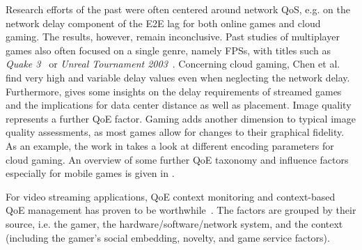 Research efforts of the past were often centered around network \acrshort{QoS}, e.g. on the network delay component of the \gls{E2E} lag for both online games and cloud gaming. The results, however, remain inconclusive. Past studies of multiplayer games also often focused on a single genre, namely \glspl{FPS}, with titles such as \textit{Quake 3}~\cite{1266180} or \textit{Unreal Tournament 2003}~\cite{Beigbeder:2004:ELL:1016540.1016556}. Concerning cloud gaming, Chen et al.~\cite{6670099} find very high and variable delay values even when neglecting the network delay. Furthermore, \cite{Choy:2012:BSC:2501560.2501563} gives some insights on the delay requirements of streamed games and the implications for data center distance as well as placement.
Image quality represents a further \gls{QoE} factor. Gaming adds
another dimension to typical image quality assessments, as most
games allow for changes to their graphical fidelity.
As an example, the work in \cite{slivarimpact} takes a look at different encoding parameters for cloud gaming. %
An overview of some further \gls{QoE} taxonomy and influence factors especially for mobile games is given in \cite{beyer2014typedisplaydelayimpact}.

For video streaming applications, \gls{QoE} context
monitoring and context-based \gls{QoE} management has proven to be
worthwhile~\cite{7140480}. The factors are grouped by
their source, i.e. the gamer, the hardware/software/network system,
and the context (including the gamer's social embedding, novelty,
and game service factors).

